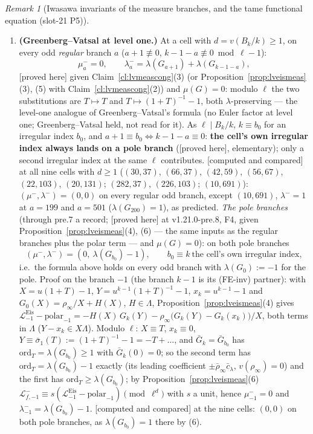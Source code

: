 \documentclass[11pt]{article}
\theoremstyle{remark}
\newtheorem{remark}[theorem]{Remark}
\newcommand{\PROVED}{\textsf{[proved here]}}
\newcommand{\CMPD}{\textsf{[computed and compared]}}   %
\begin{document}
\begin{remark}[Iwasawa invariants of the measure branches, and the tame functional equation (slot-21 P5)]
\begin{enumerate}
\item \textbf{(Greenberg--Vatsal at level one.)} At a cell with $d=v(B_k/k)\ge1$, on every odd \emph{regular} branch $a$ ($a+1\not\equiv0$, $k-1-a\not\equiv0\bmod\ell-1$):
  \[\mu^{-}_a=0,\qquad\lambda^{-}_a=\lambda(G_{a+1})+\lambda(G_{k-1-a}),\]
  \PROVED{} given Claim~\ref{cl:lvmeascong}(3) (or Proposition~\ref{prop:lveismeas}(3), (5) with Claim~\ref{cl:lvmeascong}(2)) and $\mu(G)=0$: modulo $\ell$ the two substitutions are $T\mapsto T$ and
  $T\mapsto(1+T)^{-1}-1$, both $\lambda$-preserving --- the level-one analogue of Greenberg--Vatsal's formula (no Euler factor at level one; Greenberg--Vatsal held, not read for it). As $\ell\mid B_k/k$,
  $k\equiv b_0$ for an irregular index $b_0$, and $a+1\equiv b_0\iff k-1-a\equiv0$: \textbf{the cell's own irregular index always lands on a pole branch} (\PROVED, elementary); only a second irregular index at the
  same $\ell$ contributes. \CMPD{} at all nine cells with $d\ge1$ ($(30,37)$, $(66,37)$, $(42,59)$, $(56,67)$, $(22,103)$, $(20,131)$; $(282,37)$, $(226,103)$; $(10,691)$): $(\mu^{-},\lambda^{-})=(0,0)$ on every regular
  odd branch, except $(10,691)$, $\lambda^{-}=1$ at $a=199$ and $a=501$ ($\lambda(G_{200})=1$), as predicted. \emph{The pole branches} (through pre.7 a record; \PROVED{} at v1.21.0-pre.8, F4, given
  Proposition~\ref{prop:lveismeas}(4), (6) --- the same inputs as the regular branches plus the polar term --- and $\mu(G)=0$): on both pole branches
  \[(\mu^{-},\lambda^{-})=(0,\ \lambda(G_{b_0})-1),\qquad b_0\equiv k\ \text{the cell's own irregular index},\]
  i.e.\ the formula above holds on every odd branch with $\lambda(G_0):=-1$ for the pole. Proof on the branch $-1$ (the branch $k-1$ is its (FE-inv) partner): with $X=u(1+T)-1$, $Y=u^{k-1}(1+T)^{-1}-1$,
  $x_k=u^{k-1}-1$ and $G_0(X)=\rho_\infty/X+H(X)$, $H\in\Lambda$, Proposition~\ref{prop:lveismeas}(4) gives
  $\mathcal L^{\mathrm{Eis}}_{-1}-\mathrm{polar}_{-1}=-H(X)\,G_k(Y)-\rho_\infty\bigl(G_k(Y)-G_k(x_k)\bigr)/X$, both terms in $\Lambda$ ($Y-x_k\in X\Lambda$). Modulo $\ell$: $X\equiv T$, $x_k\equiv0$,
  $Y\equiv\bar\sigma_1(T):=(1+T)^{-1}-1=-T+\dots$, and $\bar G_k=\bar G_{b_0}$ has $\mathrm{ord}_T=\lambda(G_{b_0})\ge1$ with $\bar G_k(0)=0$; so the second term has $\mathrm{ord}_T=\lambda(G_{b_0})-1$ exactly (its leading
  coefficient $\pm\bar\rho_\infty\bar c_{\lambda}$, $v(\rho_\infty)=0$) and the first has $\mathrm{ord}_T\ge\lambda(G_{b_0})$; by Proposition~\ref{prop:lveismeas}(6) $\mathcal L^{-}_{f,-1}\equiv s(\mathcal L^{\mathrm{Eis}}_{-1}-\mathrm{polar}_{-1})\pmod{\ell^{d}}$
  with $s$ a unit, hence $\mu^{-}_{-1}=0$ and $\lambda^{-}_{-1}=\lambda(G_{b_0})-1$. \CMPD{} at the nine cells: $(0,0)$ on both pole branches, as $\lambda(G_{b_0})=1$ there by (6).

\end{enumerate}
\end{remark}
\end{document}
